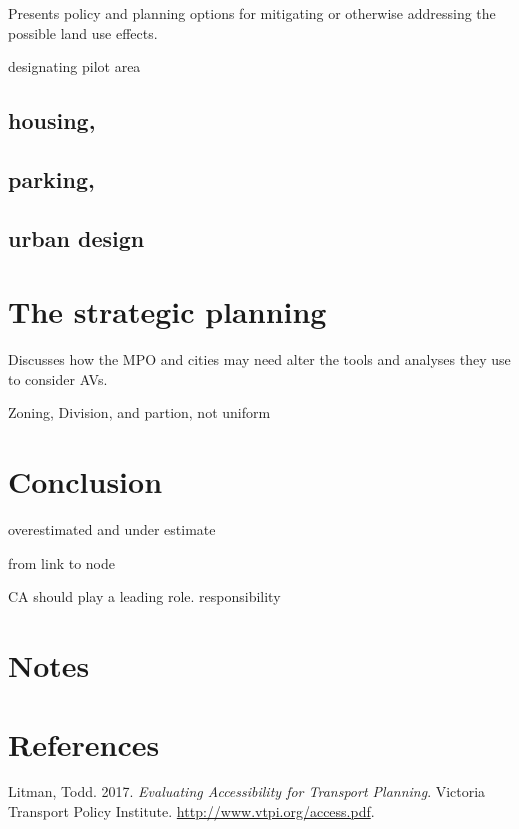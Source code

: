 \documentclass[12pt,]{article}
\begin{document}
Presents policy and planning options for mitigating or otherwise
addressing the possible land use effects.

designating pilot area

\hypertarget{housing}{%
\subsection{housing,}\label{housing}}

\hypertarget{parking}{%
\subsection{parking,}\label{parking}}

\hypertarget{urban-design}{%
\subsection{urban design}\label{urban-design}}

\hypertarget{the-strategic-planning}{%
\section{The strategic planning}\label{the-strategic-planning}}

Discusses how the MPO and cities may need alter the tools and analyses
they use to consider AVs.

Zoning, Division, and partion, not uniform

\hypertarget{conclusion}{%
\section{Conclusion}\label{conclusion}}

overestimated and under estimate

from link to node

CA should play a leading role. responsibility

\hypertarget{notes}{%
\section{Notes}\label{notes}}

\hypertarget{references}{%
\section*{References}\label{references}}

\hypertarget{refs}{}
\leavevmode\hypertarget{ref-litman2017evaluating}{}%
Litman, Todd. 2017. \emph{Evaluating Accessibility for Transport
Planning}. Victoria Transport Policy Institute.
\url{http://www.vtpi.org/access.pdf}.
\end{document}
